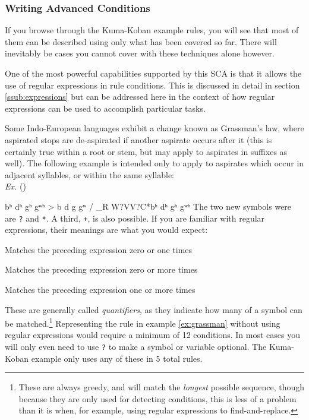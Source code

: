 \documentclass[10pt,letterpaper]{article}
\newcounter{excounter}
\newenvironment{vex}[1]{
	\refstepcounter{excounter}
	\noindent\emph{Ex.} (\arabic{excounter}\label{#1})
	\verbatim
}{\endverbatim}
\begin{document}

\subsubsection{Writing Advanced Conditions} 
\label{ssec:writing_advanced_conditions}
If you browse through the Kuma-Koban example rules, you will see that most of them can be described using only what has been covered so far. There will inevitably be cases you cannot cover with these techniques alone however.

One of the most powerful capabilities supported by this SCA is that it allows the use of regular expressions in rule conditions. This is discussed in detail in section \ref{ssub:expressions} but can be addressed here in the context of how regular expressions can be used to accomplish particular tasks.

Some Indo-European languages exhibit a change known as Grassman's law, where aspirated stops are de-aspirated if another aspirate occurs after it (this is certainly true within a root or stem, but may apply to aspirates in suffixes as well). The following example is intended only to apply to aspirates which occur in adjacent syllables, or within the same syllable:\\

\begin{vex}{ex:grassman}
bʰ dʰ gʰ gʷʰ > b  d  g  gʷ / _{R W}?VV?C*{bʰ dʰ gʰ gʷʰ}
\end{vex}
\noindent
The two new symbols were are \texttt{?} and \texttt{*}. A third, \texttt{+}, is also possible. If you are familiar with regular expressions, their meanings are what you would expect:
\begin{description}
\itemsep1pt \parskip0pt  
\item[\texttt{?}] Matches the preceding expression zero or one times
\item[\texttt{*}] Matches the preceding expression zero or more times
\item[\texttt{+}] Matches the preceding expression one or more times
\end{description}
\noindent
These are generally called \emph{quantifiers}, as they indicate how many of a symbol can be matched.\footnote{These are always greedy, and will match the \emph{longest} possible sequence, though because they are only used for detecting conditions, this is less of a problem than it is when, for example, using regular expressions to find-and-replace.} Representing the rule in example \ref{ex:grassman} without using regular expressions would require a minimum of 12 conditions. In most cases you will only even need to use \texttt{?} to make a symbol or variable optional. The Kuma-Koban example only uses any of these in 5 total rules.
\end{document}
